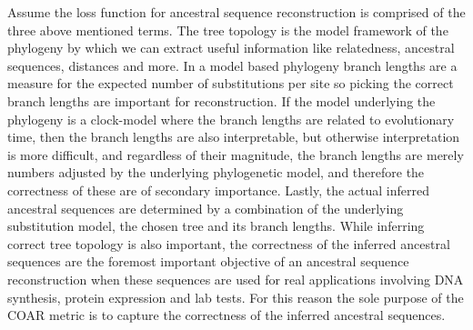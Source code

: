 Assume the loss function for ancestral sequence reconstruction is comprised of the three above mentioned terms.
The tree topology is the model framework of the phylogeny by which we can extract useful information like relatedness, ancestral sequences, distances and more.
In a model based phylogeny branch lengths are a measure for the expected number of substitutions per site so picking the correct branch lengths are important for reconstruction.
If the model underlying the phylogeny is a clock-model where the branch lengths are related to evolutionary time, then the branch lengths are also interpretable, but otherwise interpretation is more difficult, and regardless of their magnitude, the branch lengths are merely numbers adjusted by the underlying phylogenetic model, and therefore the correctness of these are of secondary importance.
Lastly, the actual inferred ancestral sequences are determined by a combination of the underlying substitution model, the chosen tree and its branch lengths.
While inferring correct tree topology is also important, the correctness of the inferred ancestral sequences are the foremost important objective of an ancestral sequence reconstruction when these sequences are used for real applications involving DNA synthesis, protein expression and lab tests.
For this reason the sole purpose of the COAR metric is to capture the correctness of the inferred ancestral sequences.

